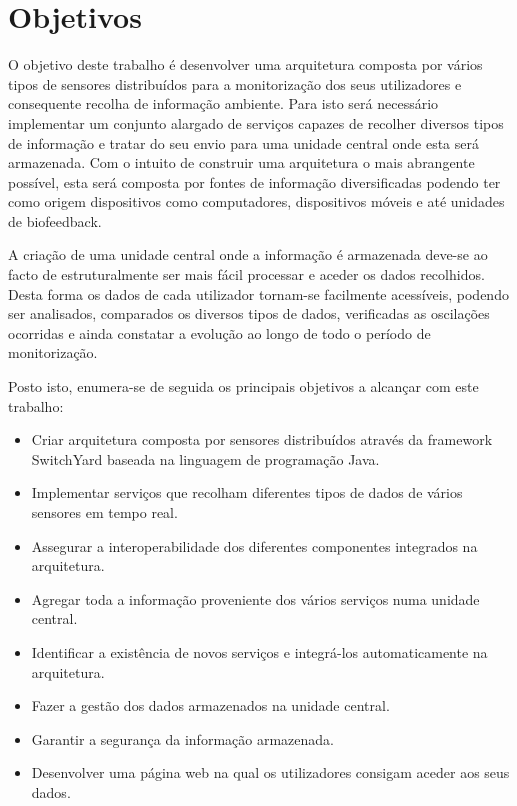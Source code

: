 \section{Objetivos}

O objetivo deste trabalho é desenvolver uma arquitetura composta por vários tipos de sensores distribuídos para a monitorização dos seus utilizadores e consequente recolha de informação ambiente. Para isto será necessário implementar um conjunto alargado de serviços capazes de recolher diversos tipos de informação e tratar do seu envio para uma unidade central onde esta será armazenada. Com o intuito de construir uma arquitetura o mais abrangente possível, esta será composta por fontes de informação diversificadas podendo ter como origem dispositivos como computadores, dispositivos móveis e até unidades de biofeedback.

A criação de uma unidade central onde a informação é armazenada deve-se ao facto de estruturalmente ser mais fácil processar e aceder os dados recolhidos. Desta forma os dados de cada utilizador tornam-se facilmente acessíveis, podendo ser analisados, comparados os diversos tipos de dados, verificadas as oscilações ocorridas e ainda constatar a evolução ao longo de todo o período de monitorização.

Posto isto, enumera-se de seguida os principais objetivos a alcançar com este trabalho:
\begin{itemize}
  \item Criar arquitetura composta por sensores distribuídos através da framework SwitchYard baseada na linguagem de programação Java.
  \item Implementar serviços que recolham diferentes tipos de dados de vários sensores em tempo real.
  \item Assegurar a interoperabilidade dos diferentes componentes integrados na arquitetura.
  \item Agregar toda a informação proveniente dos vários serviços numa unidade central.
  \item Identificar a existência de novos serviços e integrá-los automaticamente na arquitetura.
  \item Fazer a gestão dos dados armazenados na unidade central.
  \item Garantir a segurança da informação armazenada.
  \item Desenvolver uma página web na qual os utilizadores consigam aceder aos seus dados.
  \end{itemize}


